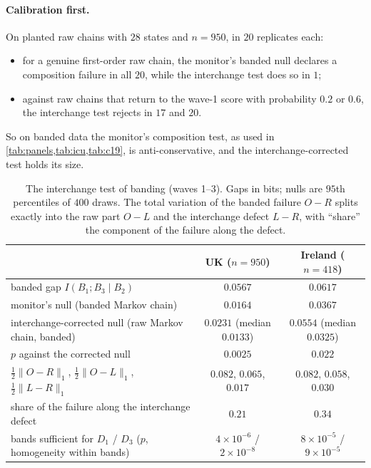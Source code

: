 \documentclass[11pt]{article}
\theoremstyle{definition}
\theoremstyle{remark}
\begin{document}
\paragraph{Calibration first.} On planted raw chains with $28$ states and $n=950$, in $20$ replicates each:
\begin{itemize}[leftmargin=*,nosep]
\item for a genuine first-order raw chain, the monitor's banded null declares a composition failure in all $20$, while the interchange
  test does so in $1$;
\item against raw chains that return to the wave-1 score with probability $0.2$ or $0.6$, the interchange test rejects in $17$ and $20$.
\end{itemize}
So on banded data the monitor's composition test, as used in \cref{tab:panels,tab:icu,tab:c19}, is anti-conservative, and the
interchange-corrected test holds its size.

\begin{table}[!htbp]
\centering\footnotesize
\caption{The interchange test of banding (waves 1--3). Gaps in bits; nulls are $95$th percentiles of $400$ draws. The total variation
of the banded failure $O-R$ splits exactly into the raw part $O-L$ and the interchange defect $L-R$, with ``share'' the component of the
failure along the defect.}\label{tab:interchange}
\begin{tabular}{lcc}
\toprule
 & UK ($n=950$) & Ireland ($n=418$)\\
\midrule
banded gap $I(B_1;B_3\mid B_2)$ & $0.0567$ & $0.0617$\\
monitor's null (banded Markov chain) & $0.0164$ & $0.0367$\\
interchange-corrected null (raw Markov chain, banded) & $0.0231$ (median $0.0133$) & $0.0554$ (median $0.0325$)\\
$p$ against the corrected null & $0.0025$ & $0.022$\\
$\tfrac12\lVert O-R\rVert_1$, $\tfrac12\lVert O-L\rVert_1$, $\tfrac12\lVert L-R\rVert_1$ & $0.082$, $0.065$, $0.017$ & $0.082$, $0.058$, $0.030$\\
share of the failure along the interchange defect & $0.21$ & $0.34$\\
bands sufficient for $D_1$ / $D_3$ ($p$, homogeneity within bands) & $4\times10^{-6}$ / $2\times10^{-8}$ & $8\times10^{-5}$ / $9\times10^{-5}$\\
\bottomrule
\end{tabular}
\end{table}
\end{document}
